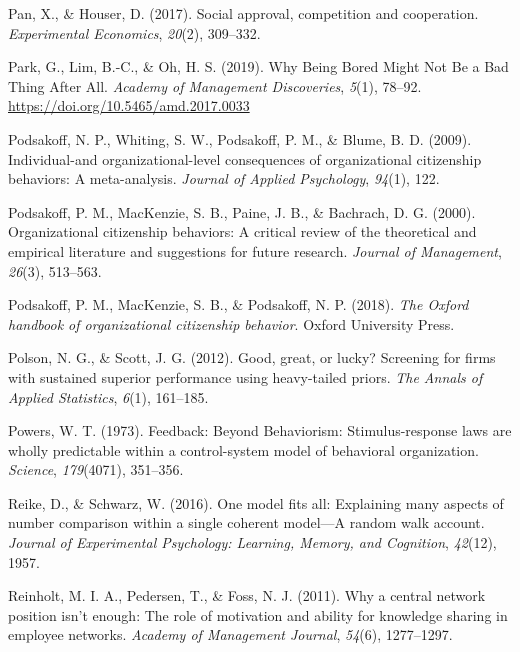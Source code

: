 \documentclass[english,,man]{apa6}
\begin{document}
\leavevmode\hypertarget{ref-pan_social_2017}{}%
Pan, X., \& Houser, D. (2017). Social approval, competition and cooperation. \emph{Experimental Economics}, \emph{20}(2), 309--332.

\leavevmode\hypertarget{ref-guihyun_park_why_2019}{}%
Park, G., Lim, B.-C., \& Oh, H. S. (2019). Why Being Bored Might Not Be a Bad Thing After All. \emph{Academy of Management Discoveries}, \emph{5}(1), 78--92. \url{https://doi.org/10.5465/amd.2017.0033}

\leavevmode\hypertarget{ref-podsakoff_individual-and_2009}{}%
Podsakoff, N. P., Whiting, S. W., Podsakoff, P. M., \& Blume, B. D. (2009). Individual-and organizational-level consequences of organizational citizenship behaviors: A meta-analysis. \emph{Journal of Applied Psychology}, \emph{94}(1), 122.

\leavevmode\hypertarget{ref-podsakoff_organizational_2000}{}%
Podsakoff, P. M., MacKenzie, S. B., Paine, J. B., \& Bachrach, D. G. (2000). Organizational citizenship behaviors: A critical review of the theoretical and empirical literature and suggestions for future research. \emph{Journal of Management}, \emph{26}(3), 513--563.

\leavevmode\hypertarget{ref-podsakoff_oxford_2018}{}%
Podsakoff, P. M., MacKenzie, S. B., \& Podsakoff, N. P. (2018). \emph{The Oxford handbook of organizational citizenship behavior}. Oxford University Press.

\leavevmode\hypertarget{ref-polson_good_2012}{}%
Polson, N. G., \& Scott, J. G. (2012). Good, great, or lucky? Screening for firms with sustained superior performance using heavy-tailed priors. \emph{The Annals of Applied Statistics}, \emph{6}(1), 161--185.

\leavevmode\hypertarget{ref-powers_feedback_1973}{}%
Powers, W. T. (1973). Feedback: Beyond Behaviorism: Stimulus-response laws are wholly predictable within a control-system model of behavioral organization. \emph{Science}, \emph{179}(4071), 351--356.

\leavevmode\hypertarget{ref-reike_one_2016}{}%
Reike, D., \& Schwarz, W. (2016). One model fits all: Explaining many aspects of number comparison within a single coherent model---A random walk account. \emph{Journal of Experimental Psychology: Learning, Memory, and Cognition}, \emph{42}(12), 1957.

\leavevmode\hypertarget{ref-reinholt_why_2011}{}%
Reinholt, M. I. A., Pedersen, T., \& Foss, N. J. (2011). Why a central network position isn't enough: The role of motivation and ability for knowledge sharing in employee networks. \emph{Academy of Management Journal}, \emph{54}(6), 1277--1297.
\end{document}
